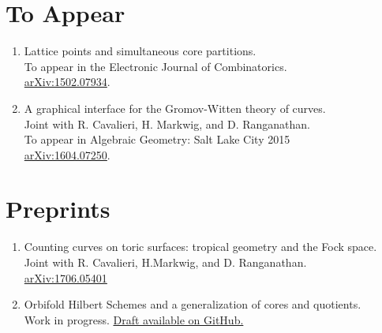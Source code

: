 \documentclass[11pt,letterpaper]{article}
\begin{document}
\section*{To Appear}
\begin{enumerate}

\item Lattice points and simultaneous core partitions. \\
To appear in the Electronic Journal of Combinatorics. \\
  \href{http://arxiv.org/abs/1502.07934}{arXiv:1502.07934}.

\item A graphical interface for the Gromov-Witten theory of curves. \\
 Joint with R. Cavalieri, H. Markwig, and D. Ranganathan. \\
To appear in Algebraic Geometry: Salt Lake City 2015 \\
 \href{http://arxiv.org/abs/1604.07250}{arXiv:1604.07250}.

\end{enumerate}

\section*{Preprints}
\begin{enumerate}
  
\item Counting curves on toric surfaces: tropical geometry and the Fock space. \\
  Joint with R. Cavalieri, H.Markwig, and D. Ranganathan. \\
  \href{https://arxiv.org/abs/1706.05401}{arXiv:1706.05401}

\item Orbifold Hilbert Schemes and a generalization of cores and quotients. \\
  Work in progress.  \href{https://github.com/ptwiddle/Orbifold-Hilbert-Schemes-partitions/blob/master/GHilb.pdf}{Draft available on GitHub.}
  \end{enumerate}
\end{document}
